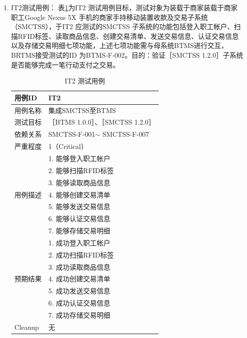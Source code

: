 \begin{enumerate}
\begin{enumerate}
				\item IT2测试用例：
					表\ref{IT2TestCase}为IT2 测试用例目标，测试对象为装载于商家装载于商家职工Google Nexus 5X 手机的商家手持移动装置收款及交易子系统（SMCTSS），于IT2 应测试的SMCTSS 子系统的功能包括登入职工帐户、扫描RFID标签、读取商品信息、创建交易清单、发送交易信息、认证交易信息以及存储交易明细七项功能，上述七项功能需与母系统BTMS进行交互，BRTMS接受测试的ID 为BTMS-F-002。目的：验证［SMCTSS 1.2.0］子系统是否能够完成一笔行动支付之交易。

						\begin{table}[!htbp]
						\caption{IT2 测试用例} %
						\centering %
						\label{IT2TestCase} %
						\begin{tabular}{|l|l|}
						\hline
						用例ID & IT2 \\ \hline
						用例名称 & 集成SMCTSS至BTMS \\ \hline
						测试目标 & {［}BTMS 1.0.0{］}、{［}SMCTSS 1.2.0{］} \\ \hline
						依赖关系 & SMCTSS-F-001$\sim$ SMCTSS-F-007 \\ \hline
						严重程度 & 1（Critical） \\ \hline
						\multirow{7}{*}{用例描述} & 1.     能够登入职工帐户 \\ \cline{2-2} 
						 & 2.     能够扫描RFID标签 \\ \cline{2-2} 
						 & 3.     能够读取商品信息 \\ \cline{2-2} 
						 & 4.     能够创建交易清单 \\ \cline{2-2} 
						 & 5.     能够发送交易信息 \\ \cline{2-2} 
						 & 6.     能够认证交易信息 \\ \cline{2-2} 
						 & 7.     能够存储交易明细 \\ \hline
						\multirow{7}{*}{预期结果} & 1.     成功登入职工帐户 \\ \cline{2-2} 
						 & 2.     成功扫描RFID标签 \\ \cline{2-2} 
						 & 3.     成功读取商品信息 \\ \cline{2-2} 
						 & 4.     成功创建交易清单 \\ \cline{2-2} 
						 & 5.     成功发送交易信息 \\ \cline{2-2} 
						 & 6.     成功认证交易信息 \\ \cline{2-2} 
						 & 7.     成功存储交易明细 \\ \hline
						Cleanup & 无 \\ \hline
						\end{tabular}
						\end{table}


\end{enumerate}
\end{enumerate}
